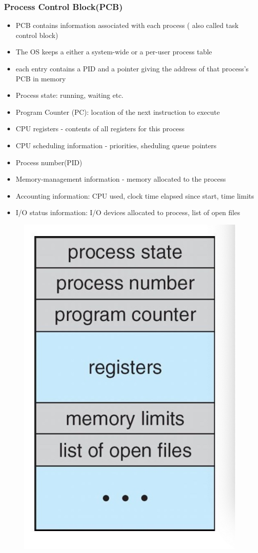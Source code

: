 \documentclass[11pt]{article}
\theoremstyle{definition}
\begin{document}
        \subsubsection{Process Control Block(PCB)}
        \begin{itemize}
            \item PCB contains information associated with each process ( also called task control block)
            \item The OS keeps a either a system-wide or a per-user process table
            \item each entry contains a PID and a pointer giving the address of that process's PCB in memory
            \item Process state: running, waiting etc.
            \item Program Counter (PC): location of the next instruction to execute
            \item CPU registers - contents of all registers for this process
            \item CPU scheduling information - priorities, sheduling queue pointers
            \item Process number(PID)
            \item Memory-management information - memory allocated to the process
            \item Accounting information: CPU used, clock time elapsed since start, time limits
            \item I/O status information: I/O devices allocated to process, list of open files
        \end{itemize}
        \begin{figure}[htbp]
            \centering
                \includegraphics[width=0.30\linewidth]{img/PCB.jpg}
                \label{fig:enter-label}
            \end{figure}
\end{document}
